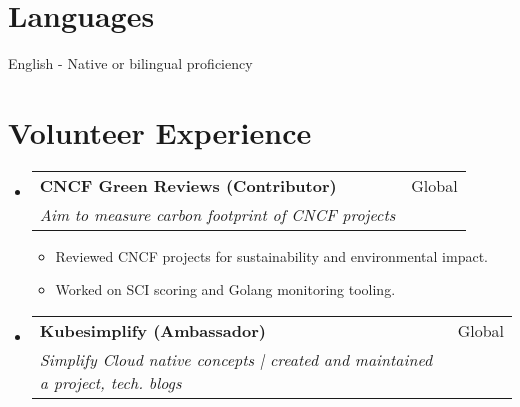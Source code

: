 \documentclass[a4paper,20pt]{article}
\makeatletter
\newcommand{\resumeSubheading}[4]{
  \vspace{-1pt}\item
    \begin{tabular*}{0.97\textwidth}{l@{\extracolsep{\fill}}r}
      \textbf{#1} & #2 \\
      \textit{#3} & \textit{#4} \\
    \end{tabular*}\vspace{-5pt}
}
\newcommand{\resumeSubHeadingListStart}{\begin{itemize}[leftmargin=*]}
\newcommand{\resumeSubHeadingListEnd}{\end{itemize}}
\makeatother
\begin{document}
\section{Languages}
\begin{description}[font=$\bullet$]
\item {English - Native or bilingual proficiency}

\end{description}

\vspace{-5pt}
\section{Volunteer Experience}
  \resumeSubHeadingListStart
    \resumeSubheading
    {CNCF Green Reviews (Contributor)}{Global}
    {Aim to measure carbon footprint of CNCF projects}{}
    \begin{itemize}[leftmargin=*]
        \item Reviewed CNCF projects for sustainability and environmental impact.
        \item Worked on SCI scoring and Golang monitoring tooling.
    \end{itemize}
    \resumeSubheading
    {Kubesimplify (Ambassador)}{Global}
    {Simplify Cloud native concepts | created and maintained a project, tech. blogs}{}

\resumeSubHeadingListEnd
\end{document}
